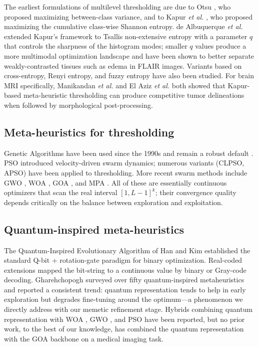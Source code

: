 The earliest formulations of multilevel thresholding are due to Otsu \cite{otsu1979}, who proposed maximizing between-class variance, and to Kapur \emph{et al.} \cite{kapur1985}, who proposed maximizing the cumulative class-wise Shannon entropy. de Albuquerque \emph{et al.} \cite{deAlbuquerque2004} extended Kapur's framework to Tsallis non-extensive entropy with a parameter $q$ that controls the sharpness of the histogram modes; smaller $q$ values produce a more multimodal optimization landscape and have been shown to better separate weakly-contrasted tissues such as edema in FLAIR images. Variants based on cross-entropy, Renyi entropy, and fuzzy entropy have also been studied. For brain MRI specifically, Manikandan \emph{et al.} \cite{manikandan2014brats} and El Aziz \emph{et al.} \cite{elaziz2017multilevel} both showed that Kapur-based meta-heuristic thresholding can produce competitive tumor delineations when followed by morphological post-processing.

\subsection{Meta-heuristics for thresholding}

Genetic Algorithms have been used since the 1990s and remain a robust default \cite{tao2003genetic}. PSO \cite{kennedy1995pso} introduced velocity-driven swarm dynamics; numerous variants (CLPSO, APSO) have been applied to thresholding. More recent swarm methods include GWO \cite{mirjalili2014gwo}, WOA \cite{mirjalili2016woa}, GOA \cite{saremi2017goa}, and MPA \cite{faramarzi2020mpa}. All of these are essentially continuous optimizers that scan the real interval $[1,L{-}1]^k$; their convergence quality depends critically on the balance between exploration and exploitation.

\subsection{Quantum-inspired meta-heuristics}

The Quantum-Inspired Evolutionary Algorithm of Han and Kim \cite{han2002qiea} established the standard Q-bit + rotation-gate paradigm for binary optimization. Real-coded extensions \cite{talbi2017qiea,wright2017qiea} mapped the bit-string to a continuous value by binary or Gray-code decoding. Gharehchopogh \cite{gharehchopogh2023survey} surveyed over fifty quantum-inspired metaheuristics and reported a consistent trend: quantum representation tends to help in early exploration but degrades fine-tuning around the optimum---a phenomenon we directly address with our memetic refinement stage. Hybrids combining quantum representation with WOA \cite{agrawal2019qwoa}, GWO \cite{srikanth2018qgwo}, and PSO \cite{sun2004qpso} have been reported, but no prior work, to the best of our knowledge, has combined the quantum representation with the GOA backbone on a medical imaging task.


